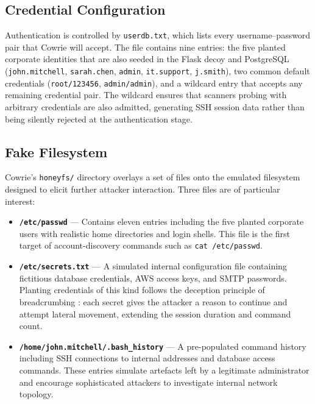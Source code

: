 \subsection{Credential Configuration}

Authentication is controlled by \texttt{userdb.txt}, which lists every
username–password pair that Cowrie will accept. The file contains nine entries:
the five planted corporate identities that are also seeded in the Flask decoy
and PostgreSQL (\texttt{john.mitchell}, \texttt{sarah.chen}, \texttt{admin},
\texttt{it.support}, \texttt{j.smith}), two common default credentials
(\texttt{root/123456}, \texttt{admin/admin}), and a wildcard entry that accepts
any remaining credential pair. The wildcard ensures that scanners probing with
arbitrary credentials are also admitted, generating SSH session data rather than
being silently rejected at the authentication stage.

\subsection{Fake Filesystem}

Cowrie's \texttt{honeyfs/} directory overlays a set of files onto the emulated
filesystem designed to elicit further attacker interaction. Three files are of
particular interest:

\begin{itemize}
    \item \textbf{\texttt{/etc/passwd}} — Contains eleven entries including the
    five planted corporate users with realistic home directories and login
    shells. This file is the first target of account-discovery commands such as
    \texttt{cat /etc/passwd}.

    \item \textbf{\texttt{/etc/secrets.txt}} — A simulated internal
    configuration file containing fictitious database credentials, AWS access
    keys, and SMTP passwords. Planting credentials of this kind follows the
    deception principle of breadcrumbing \cite{Leita2008Phishing}: each secret
    gives the attacker a reason to continue and attempt lateral movement,
    extending the session duration and command count.

    \item \textbf{\texttt{/home/john.mitchell/.bash\_history}} — A
    pre-populated command history including SSH connections to internal
    addresses and database access commands. These entries simulate artefacts
    left by a legitimate administrator and encourage sophisticated attackers to
    investigate internal network topology.
\end{itemize}

